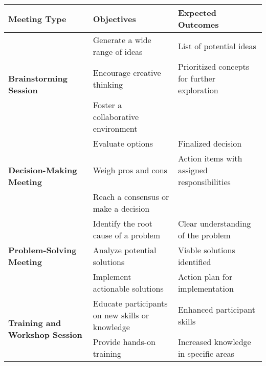 \begin{table*}[ht]
    \centering
    \scriptsize
    \renewcommand{\arraystretch}{1.1} %
    \begin{tabularx}{\textwidth}{m{4cm}XX}
        \toprule
        \rowcolor{gray!20}
        \textbf{Meeting Type} & \textbf{Objectives} & \textbf{Expected Outcomes} \\
        \midrule
        \multirow{3}{*}{\textbf{Brainstorming Session}} 
            & Generate a wide range of ideas & List of potential ideas \\
        
            & Encourage creative thinking  & Prioritized concepts for further exploration \\
        
            & Foster a collaborative environment & \\
        \midrule
        \multirow{3}{*}{\textbf{Decision-Making Meeting}} 
            & Evaluate options & Finalized decision \\
        
            & Weigh pros and cons & Action items with assigned responsibilities \\
        
            & Reach a consensus or make a decision & \\
        \midrule
        \multirow{3}{*}{\textbf{Problem-Solving Meeting}} 
            & Identify the root cause of a problem & Clear understanding of the problem \\
        
            & Analyze potential solutions & Viable solutions identified \\
        
            & Implement actionable solutions & Action plan for implementation \\
        \midrule
        \multirow{3}{*}{\textbf{Training and Workshop Session}} 
            & Educate participants on new skills or knowledge & Enhanced participant skills \\
        
            & Provide hands-on training & Increased knowledge in specific areas \\
        

\end{tabularx}
\end{table*}
